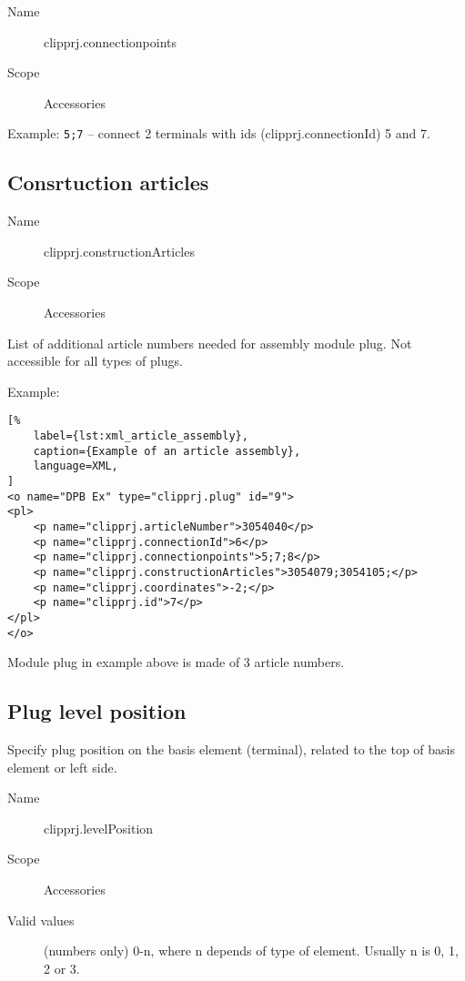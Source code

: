 \documentclass[%
	a4paper,
	oneside,
	listof=numbered,
	parskip=half,
	headsepline=true,
	footsepline=false,
	normalheadings,
	0.7headlines,
	headexclude,
	]{scrbook}
\begin{document}
\begin{description}
	\item[Name] clipprj.connectionpoints
	\item[Scope] Accessories
\end{description}

Example: \verb|5;7| – connect 2 terminals with ids (clipprj.connectionId) 5 and 7.

\subsection{Consrtuction articles}

\begin{description}
	\item[Name] clipprj.constructionArticles
	\item[Scope] Accessories
\end{description}

List of additional article numbers needed for assembly module plug.
Not accessible for all types of plugs.

Example:

\begin{lstlisting}[%
	label={lst:xml_article_assembly},
	caption={Example of an article assembly},
	language=XML,
]
<o name="DPB Ex" type="clipprj.plug" id="9">
<pl>
	<p name="clipprj.articleNumber">3054040</p>
	<p name="clipprj.connectionId">6</p>
	<p name="clipprj.connectionpoints">5;7;8</p>
	<p name="clipprj.constructionArticles">3054079;3054105;</p>
	<p name="clipprj.coordinates">-2;</p>
	<p name="clipprj.id">7</p>
</pl>
</o>
\end{lstlisting}

Module plug in example above is made of 3 article numbers.

\subsection{Plug level position}

Specify plug position on the basis element (terminal), related to the top of
basis element or left side.

\begin{description}
	\item[Name] clipprj.levelPosition
	\item[Scope] Accessories
	\item[Valid values] (numbers only) 0-n, where n depends of type of element.
	Usually n is 0, 1, 2 or 3.
\end{description}
\end{document}
